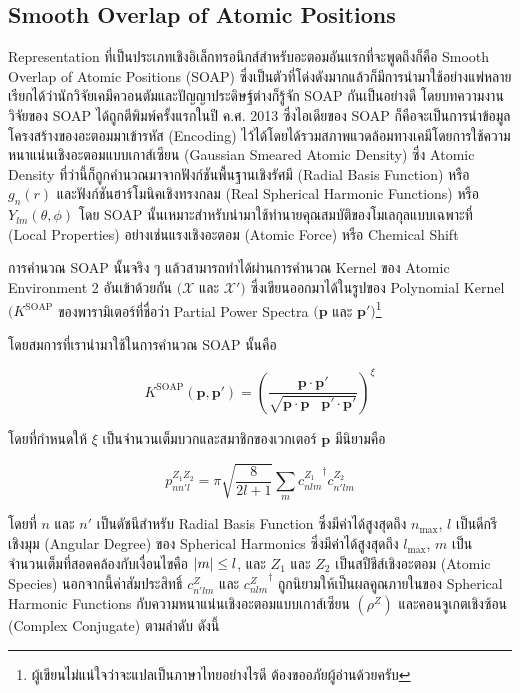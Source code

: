 \subsection{Smooth Overlap of Atomic Positions}
\label{ssec:soap}

Representation ที่เป็นประเภทเชิงอิเล็กทรอนิกส์สำหรับอะตอมอันแรกที่จะพูดถึงก็คือ Smooth Overlap of Atomic Positions (SOAP) ซึ่งเป็นตัวที่โด่งดังมากแล้วก็มีการนำมาใช้อย่างแพ่หลาย เรียกได้ว่านักวิจัยเคมีควอนตัมและปัญญาประดิษฐ์ต่างก็รู้จัก SOAP กันเป็นอย่างดี โดยบทความงานวิจัยของ SOAP ได้ถูกตีพิมพ์ครั้งแรกในปี ค.ศ. 2013 ซึ่งไอเดียของ SOAP ก็คือจะเป็นการนำข้อมูลโครงสร้างของอะตอมมาเข้ารหัส (Encoding) ไว้ได้โดยได้รวมสภาพแวดล้อมทางเคมีโดยการใช้ความหนาแน่นเชิงอะตอมแบบเกาส์เซียน (Gaussian Smeared Atomic Density) ซึ่ง Atomic Density ที่ว่านี้ก็ถูกคำนวณมาจากฟังก์ชันพื้นฐานเชิงรัศมี (Radial Basis Function) หรือ $g_{n}(r)$ และฟังก์ชันฮาร์โมนิคเชิงทรงกลม (Real Spherical Harmonic Functions) หรือ $Y_{lm}(\theta, \phi)$\autocite{bartok2013,de2016} โดย SOAP นั้นเหมาะสำหรับนำมาใช้ทำนายคุณสมบัติของโมเลกุลแบบเฉพาะที่ (Local Properties) อย่างเช่นแรงเชิงอะตอม (Atomic Force) หรือ Chemical Shift

การคำนวณ SOAP นั้นจริง ๆ แล้วสามารถทำได้ผ่านการคำนวณ Kernel ของ Atomic Environment 2 อันเข้าด้วยกัน $(\mathcal{X}$ และ $\mathcal{X}')$ ซึ่งเขียนออกมาได้ในรูปของ Polynomial Kernel $(K^\text{SOAP}$ ของพารามิเตอร์ที่ชื่อว่า Partial Power Spectra $(\bm{p}$ และ $\bm{p}')$\footnote{ผู้เขียนไม่แน่ใจว่าจะแปลเป็นภาษาไทยอย่างไรดี ต้องขออภัยผู้อ่านด้วยครับ}

โดยสมการที่เรานำมาใช้ในการคำนวณ SOAP นั้นคือ

\begin{equation}\label{eq:soap}
    K^\text{SOAP}(\bm{p}, \bm{p'}) 
    = 
    \left( \frac{\bm{p} \cdot \bm{p'}}{\sqrt{\bm{p} \cdot \bm{p} \;\;\; \bm{p'} \cdot \bm{p'}}}\right)^{\xi}
\end{equation}

\noindent โดยที่กำหนดให้ $\xi$ เป็นจำนวนเต็มบวกและสมาชิกของเวกเตอร์ $\bm{p}$ มีนิยามคือ

\begin{equation}\label{eq:soap_power_spec}
    p^{Z_1 Z_2}_{n n' l} 
    = 
    \pi \sqrt{\frac{8}{2l+1}}\sum_m {c^{Z_1}_{n l m}}^{\dagger} c^{Z_2}_{n' l m}
\end{equation}

\noindent โดยที่ $n$ และ $n'$ เป็นดัชนีสำหรับ Radial Basis Function ซึ่งมีค่าได้สูงสุดถึง $n_{\max}$, $l$ เป็นดีกรีเชิงมุม (Angular Degree) ของ Spherical Harmonics ซึ่งมีค่าได้สูงสุดถึง $l_{\max}$, $m$ เป็นจำนวนเต็มที่สอดคล้องกับเงื่อนไขคือ $\abs{m} \leq l$, และ $Z_{1}$ และ $Z_{2}$ เป็นสปีชีส์เชิงอะตอม (Atomic Species) นอกจากนี้ค่าสัมประสิทธิ์ $c^{Z}_{n'lm}$ และ ${c^{Z}_{nlm}}^{\dagger}$ ถูกนิยามให้เป็นผลคูณภายในของ Spherical Harmonic Functions กับความหนาแน่นเชิงอะตอมแบบเกาส์เซียน $(\rho^Z)$ และคอนจูเกตเชิงซ้อน (Complex Conjugate) ตามลำดับ\autocite{de2016} ดังนี้

